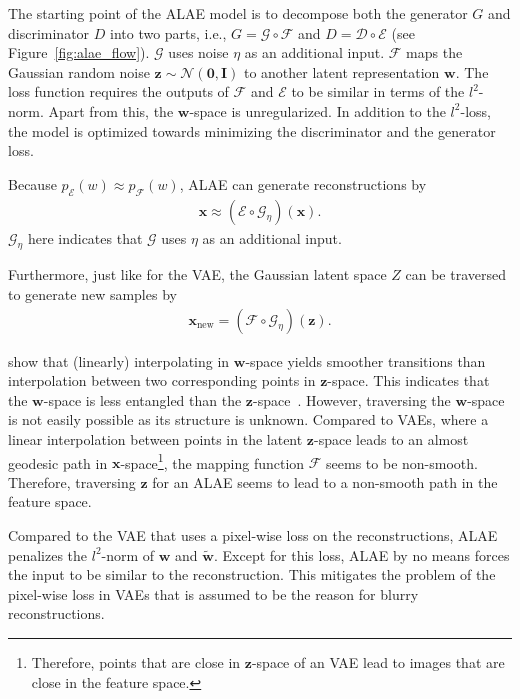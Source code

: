The starting point of the \ac{ALAE} model is to decompose both the generator $G$ and discriminator $D$ into two parts, i.e., $G=\mathcal{G}\circ \mathcal{F}$ and $D=\mathcal{D}\circ \mathcal{E}$ (see Figure~\ref{fig:alae_flow}).
$\mathcal{G}$ uses noise $\eta$ as an additional input.
$\mathcal{F}$ maps the Gaussian random noise $\bm{z} \sim \mathcal{N}(\bm{0}, \bm{I})$ to another latent representation $\bm{w}$.
The loss function requires the outputs of $\mathcal{F}$ and $\mathcal{E}$ to be similar in terms of the $l^2$-norm.
Apart from this, the $\bm{w}$-space is unregularized.
In addition to the $l^2$-loss, the model is optimized towards minimizing the discriminator and the generator loss.

Because $p_{\mathcal{E}}(w) \approx p_{\mathcal{F}}(w)$, \ac{ALAE} can generate reconstructions by
\begin{align}
    \bm{x}\approx (\mathcal{E}\circ \mathcal{G}_\eta)(\bm{x}).
\end{align}
$\mathcal{G}_\eta$ here indicates that $\mathcal{G}$ uses $\eta$ as an additional input.

Furthermore, just like for the \ac{VAE}, the Gaussian latent space $Z$ can be traversed to generate new samples by
\begin{align}
    \bm{x}_{\text{new}} = (\mathcal{F}\circ \mathcal{G}_\eta)(\bm{z}).
\end{align}

\citet{pidhorskyi2020adversarial} show that (linearly) interpolating in $\bm{w}$-space yields smoother transitions than interpolation between two corresponding points in $\bm{z}$-space.
This indicates that the $\bm{w}$-space is less entangled than the $\bm{z}$-space~\citep{shao2018riemannian,arvanitidis2017latent}.
However, traversing the $\bm{w}$-space is not easily possible as its structure is unknown.
Compared to \acp{VAE}, where a linear interpolation between points in the latent $\bm{z}$-space leads to an almost geodesic path in $\bm{x}$-space\footnote{Therefore, points that are close in $\bm{z}$-space of an \ac{VAE} lead to images that are close in the feature space.}, the mapping function $\mathcal{F}$ seems to be non-smooth.
Therefore, traversing $\bm{z}$ for an \ac{ALAE} seems to lead to a non-smooth path in the feature space.

Compared to the \ac{VAE} that uses a pixel-wise loss on the reconstructions, \ac{ALAE} penalizes the $l^2$-norm of $\bm{w}$ and $\tilde{\bm{w}}$.
Except for this loss, \ac{ALAE} by no means forces the input to be similar to the reconstruction.
This mitigates the problem of the pixel-wise loss in \acp{VAE} that is assumed to be the reason for blurry reconstructions.

